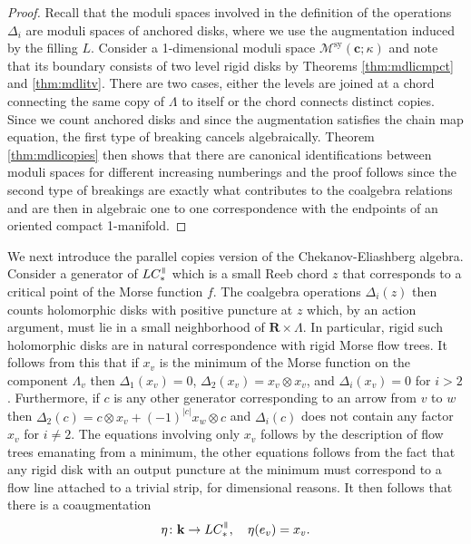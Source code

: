 \documentclass{gtpart}
\newtheorem{lem}[thm]{Lemma}
\renewcommand{\k}{\mathbf{k}}
\renewcommand{\R}{\mathbf{R}}
\newcommand{\sy}{\mathrm{sy}}
\renewcommand{\parallel}{{\mkern3mu\vphantom{\perp}\vrule depth 0pt\mkern2mu\vrule depth
0pt\mkern3mu}}
\begin{document}
\begin{proof}
Recall that the moduli spaces involved in the definition of the operations $\Delta_{i}$ are moduli spaces of anchored disks, where we use the augmentation induced by the filling $L$. Consider a 1-dimensional moduli space $\mathcal{M}^{\sy}(\mathbf{c};\kappa)$ and note that its boundary consists of two level rigid disks by Theorems \ref{thm:mdlicmpct} and \ref{thm:mdlitv}. There are two cases, either the levels are joined at a chord connecting the same copy of $\Lambda$ to itself or the chord connects distinct copies. Since we count anchored disks and since the augmentation satisfies the chain map equation, the first type of breaking cancels algebraically. 
Theorem \ref{thm:mdlicopies} then shows that there are canonical identifications between moduli spaces for different increasing numberings and the proof follows since the second type of breakings  are exactly what contributes to the coalgebra relations and are then in algebraic one to one correspondence with the endpoints of an oriented compact 1-manifold.
\end{proof}
%
%

We next introduce the parallel copies version of the Chekanov-Eliashberg algebra. Consider a
generator of $LC_{\ast}^{\parallel}$ which is a small Reeb chord $z$ that corresponds to a critical
point of the Morse function $f$. The coalgebra operations $\Delta_{i}(z)$ then counts holomorphic
disks with positive puncture at $z$ which, by an action argument, must lie in a small neighborhood
of $\R\times\Lambda$. In particular, rigid such holomorphic disks are in natural correspondence with
rigid Morse flow trees. It follows from this that if $x_{v}$ is the minimum of the Morse function on
the component $\Lambda_{v}$ then $\Delta_{1}(x_{v})=0$, $\Delta_{2}(x_{v})=x_{v}\otimes x_{v}$, and
$\Delta_{i}(x_{v})=0$ for $i>2$. Furthermore, if $c$ is any other generator corresponding to
an arrow from $v$ to $w$ then $\Delta_{2}(c)=c\otimes x_{v}+(-1)^{|c|}x_{w}\otimes c$ and
$\Delta_{i}(c)$ does not contain any factor $x_{v}$ for $i\ne 2$. The equations involving only
$x_{v}$ follows by the description of flow trees emanating from a minimum, the other equations
follows from the fact that any rigid disk with an output puncture at the minimum must correspond to
a flow line attached to a trivial strip, for dimensional reasons. It then follows that there is a
coaugmentation  \begin{equation}\label{eq:coaugparallel}
\eta\colon\k\to LC_{\ast}^{\parallel},\quad \eta(e_{v})=x_{v}.
\end{equation}
 
\end{document}
